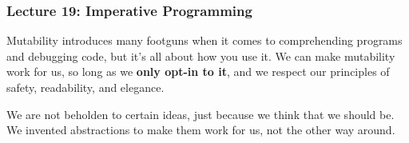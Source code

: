\documentclass[aspectratio=169, handout]{beamer}
\begin{document}
{\begin{frame}[fragile]
  \frametitle{Lecture 19: Imperative Programming}

  Mutability introduces many footguns when it comes to comprehending programs
  and debugging code, but it's all about how you use it. We can make mutability
  work for us, so long as we \textbf{only opt-in to it}, and we respect our principles
  of safety, readability, and elegance.

  \pause
  \vspace{\fill}

  We are not beholden to certain ideas, just because we think
  that we should be. We invented abstractions to make them work for us,
  not the other way around.

  \pause
  \vspace{\fill}

\end{frame}
}
\end{document}

